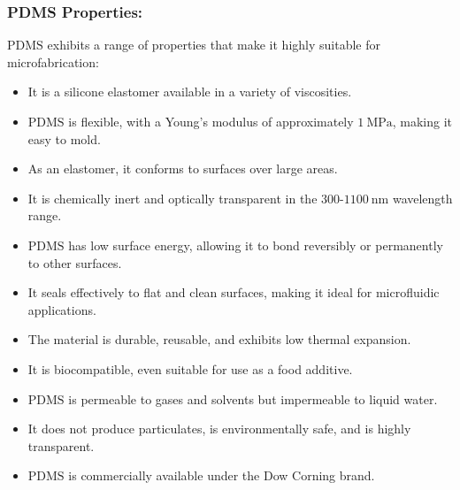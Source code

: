 \documentclass{report}
\begin{document}
\subsubsection{PDMS Properties:}
$\text{PDMS}$ exhibits a range of properties that make it highly suitable for microfabrication:
\begin{itemize}
    \item It is a silicone elastomer available in a variety of viscosities.
    \item $\text{PDMS}$ is flexible, with a Young’s modulus of approximately $1~\text{MPa}$, making it easy to mold.
    \item As an elastomer, it conforms to surfaces over large areas.
    \item It is chemically inert and optically transparent in the $300$-$1100~\text{nm}$ wavelength range.
    \item $\text{PDMS}$ has low surface energy, allowing it to bond reversibly or permanently to other surfaces.
    \item It seals effectively to flat and clean surfaces, making it ideal for microfluidic applications.
    \item The material is durable, reusable, and exhibits low thermal expansion.
    \item It is biocompatible, even suitable for use as a food additive.
    \item $\text{PDMS}$ is permeable to gases and solvents but impermeable to liquid water.
    \item It does not produce particulates, is environmentally safe, and is highly transparent.
    \item $\text{PDMS}$ is commercially available under the Dow Corning brand.
\end{itemize}
\end{document}
